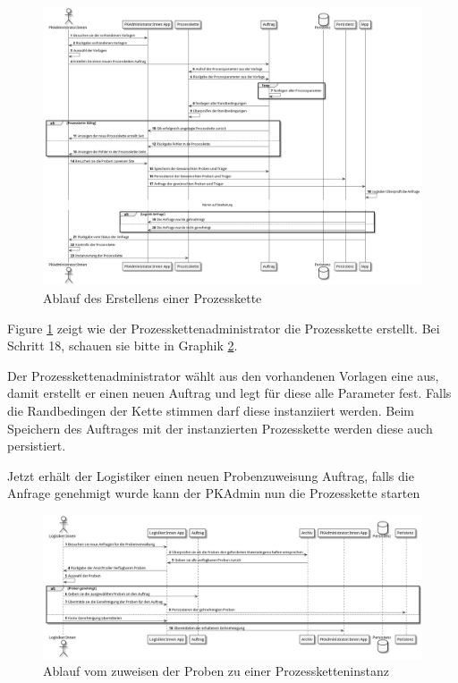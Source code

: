 \documentclass[enabledeprecatedfontcommands,fontsize=12pt,paper=a4,twoside]{scrartcl}
\begin{document}
\begin{figure}[H]
  \includegraphics[width=\linewidth]{UML/pkErstellen.png}
  \caption{Ablauf des Erstellens einer Prozesskette}
  \label{fig:pkErstellen}
\end{figure}

Figure \ref{fig:pkErstellen} zeigt wie der Prozesskettenadministrator die Prozesskette erstellt. 
Bei Schritt 18, schauen sie bitte in Graphik \ref{fig:logstikProbenPüftZuweisen}. 

Der Prozesskettenadministrator wählt aus den vorhandenen Vorlagen eine aus, damit erstellt er einen neuen Auftrag und legt für diese alle Parameter fest.
Falls die Randbedingen der Kette stimmen darf diese instanziiert werden. Beim Speichern des Auftrages mit der instanzierten Prozesskette werden diese auch persistiert.

Jetzt erhält der Logistiker einen neuen Probenzuweisung Auftrag, falls die Anfrage genehmigt wurde kann der PKAdmin nun die Prozesskette starten

\begin{figure}[H]
  \includegraphics[width=\linewidth]{UML/logstikProbenPueftZuweisen.png}
  \caption{Ablauf vom zuweisen der Proben zu einer Prozessketteninstanz}
  \label{fig:logstikProbenPüftZuweisen}
\end{figure}
\end{document}
